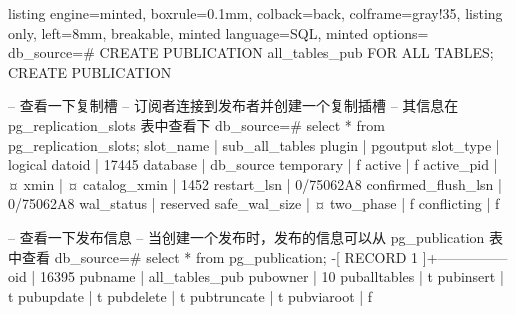 \documentclass[lang=cn,a4paper,zihao=-4,fontset=none]{beautybook}
\begin{document}
\begin{tcblisting}{
  listing engine=minted,
  boxrule=0.1mm,
  colback=back,
  colframe=gray!35,
  listing only,
  left=8mm,
  breakable,
  minted language=SQL, %
  minted options={} %
}
  db_source=# CREATE PUBLICATION all_tables_pub FOR ALL TABLES;
  CREATE PUBLICATION
  
  -- 查看一下复制槽
  -- 订阅者连接到发布者并创建一个复制插槽
  -- 其信息在 pg_replication_slots 表中查看下
  db_source=# select * from pg_replication_slots;
  slot_name           | sub_all_tables
  plugin              | pgoutput
  slot_type           | logical
  datoid              | 17445
  database            | db_source
  temporary           | f
  active              | f
  active_pid          | ¤
  xmin                | ¤
  catalog_xmin        | 1452
  restart_lsn         | 0/75062A8
  confirmed_flush_lsn | 0/75062A8
  wal_status          | reserved
  safe_wal_size       | ¤
  two_phase           | f
  conflicting         | f
  
  -- 查看一下发布信息
  -- 当创建一个发布时，发布的信息可以从 pg_publication 表中查看
  db_source=# select * from pg_publication;
  -[ RECORD 1 ]+---------------
  oid          | 16395
  pubname      | all_tables_pub
  pubowner     | 10
  puballtables | t
  pubinsert    | t
  pubupdate    | t
  pubdelete    | t
  pubtruncate  | t
  pubviaroot   | f
  \end{tcblisting}


\ISBNcode{\EANisbn[ISBN=978-7-301-05151-1]} %
\makebottomcover
\end{document}
